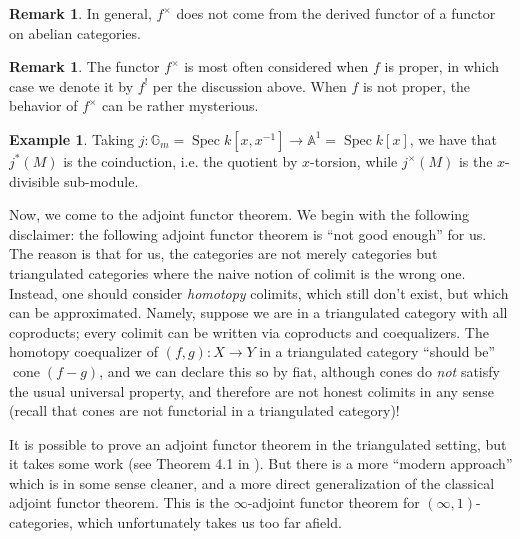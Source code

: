 \documentclass[10pt]{article}
\theoremstyle{definition}
\newtheorem{exmp}[thm]{Example}
\newtheorem{rmk}[thm]{Remark}
\DeclareMathOperator{\Coh}{Coh}
\DeclareMathOperator{\Spec}{Spec}
\DeclareMathOperator{\QCoh}{QCoh}
\DeclareMathOperator{\IndCoh}{IndCoh}
\DeclareMathOperator{\cone}{cone}
\newcommand{\G}{\mathbb{G}}
\newcommand{\todo}[1]{\textbf{\textcolor{red}{TODO #1}}}
\begin{document}
\begin{rmk}
In general, $f^\times$ does not come from the derived functor of a functor on abelian categories.
\end{rmk}

\begin{rmk}
The functor $f^\times$ is most often considered when $f$ is proper, in which case we denote it by $f^!$ per the discussion above.  When $f$ is not proper, the behavior of $f^\times$ can be rather mysterious.
\end{rmk}

\begin{exmp}
Taking $j: \G_m = \Spec k[x,x^{-1}] \rightarrow \mathbb{A}^1 = \Spec k[x]$, we have that $j^*(M)$ is the coinduction, i.e. the quotient by $x$-torsion, while $j^\times(M)$ is the $x$-divisible sub-module.
\end{exmp}






Now, we come to the adjoint functor theorem.  We begin with the following disclaimer: the following adjoint functor theorem is ``not good enough'' for us.  The reason is that for us, the categories are not merely categories but triangulated categories where the naive notion of colimit is the wrong one.  Instead, one should consider \emph{homotopy} colimits, which still don't exist, but which can be approximated.  Namely, suppose we are in a triangulated category with all coproducts; every colimit can be written via coproducts and coequalizers.  The homotopy coequalizer of $(f, g): X \rightarrow Y$ in a triangulated category ``should be'' $\cone(f - g)$, and we can declare this so by fiat, although cones do \emph{not} satisfy the usual universal property, and therefore are not honest colimits in any sense (recall that cones are not functorial in a triangulated category)!

It is possible to prove an adjoint functor theorem in the triangulated setting, but it takes some work (see Theorem 4.1 in \cite{Neeman:GDBR}).  But there is a more ``modern approach'' which is in some sense cleaner, and a more direct generalization of the classical adjoint functor theorem.  This is the $\infty$-adjoint functor theorem for $(\infty, 1)$-categories, which unfortunately takes us too far afield.
\end{document}
